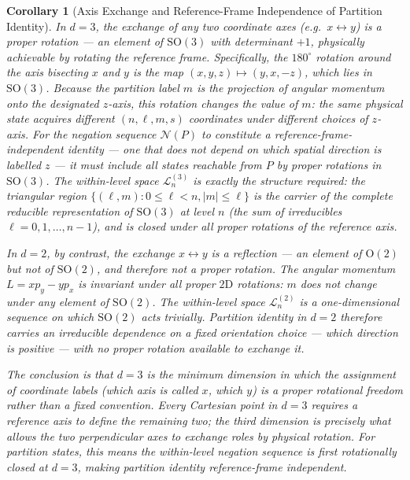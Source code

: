 \documentclass[twocolumn,10pt,a4paper]{article}
\theoremstyle{thmstyle}
\newtheorem{corollary}[theorem]{Corollary}
\theoremstyle{definition}
\theoremstyle{remark}
\begin{document}
\begin{corollary}[Axis Exchange and Reference-Frame Independence of Partition Identity]
\label{cor:axis-exchange}
In $d = 3$, the exchange of any two coordinate axes (e.g.\ $x \leftrightarrow y$) is a \emph{proper rotation} --- an element of $\mathrm{SO}(3)$ with determinant $+1$, physically achievable by rotating the reference frame. Specifically, the $180^\circ$ rotation around the axis bisecting $x$ and $y$ is the map $(x, y, z) \mapsto (y, x, -z)$, which lies in $\mathrm{SO}(3)$. Because the partition label $m$ is the projection of angular momentum onto the designated $z$-axis, this rotation changes the value of $m$: the same physical state acquires different $(n, \ell, m, s)$ coordinates under different choices of $z$-axis. For the negation sequence $\mathcal{N}(P)$ to constitute a reference-frame-independent identity --- one that does not depend on which spatial direction is labelled $z$ --- it must include all states reachable from $P$ by proper rotations in $\mathrm{SO}(3)$. The within-level space $\mathcal{L}_n^{(3)}$ is exactly the structure required: the triangular region $\{(\ell, m) : 0 \leq \ell < n, |m| \leq \ell\}$ is the carrier of the complete reducible representation of $\mathrm{SO}(3)$ at level $n$ (the sum of irreducibles $\ell = 0, 1, \ldots, n-1$), and is closed under all proper rotations of the reference axis.

In $d = 2$, by contrast, the exchange $x \leftrightarrow y$ is a reflection --- an element of $\mathrm{O}(2)$ but \emph{not} of $\mathrm{SO}(2)$, and therefore not a proper rotation. The angular momentum $L = x p_y - y p_x$ is invariant under all proper $2\mathrm{D}$ rotations: $m$ does not change under any element of $\mathrm{SO}(2)$. The within-level space $\mathcal{L}_n^{(2)}$ is a one-dimensional sequence on which $\mathrm{SO}(2)$ acts trivially. Partition identity in $d = 2$ therefore carries an irreducible dependence on a fixed orientation choice --- which direction is positive --- with no proper rotation available to exchange it.

The conclusion is that $d = 3$ is the minimum dimension in which the assignment of coordinate labels (which axis is called $x$, which $y$) is a proper rotational freedom rather than a fixed convention. Every Cartesian point in $d = 3$ requires a reference axis to define the remaining two; the third dimension is precisely what allows the two perpendicular axes to exchange roles by physical rotation. For partition states, this means the within-level negation sequence is first rotationally closed at $d = 3$, making partition identity reference-frame independent.
\end{corollary}
\end{document}
